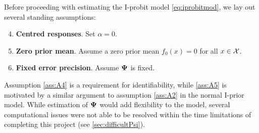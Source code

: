 Before proceeding with estimating the I-probit model \cref{eq:iprobitmod}, we lay out several standing assumptions:
\begin{enumerate}[label=A\arabic*,ref=A\arabic*]
  \setcounter{enumi}{3}
  \item \textbf{Centred responses}. Set $\alpha = 0$. \label{ass:A4}  
  \item \textbf{Zero prior mean}. Assume a zero prior mean $f_0(x) = 0$ for all $x\in{\mathcal X}$. \label{ass:A5} 
  \item \textbf{Fixed error precision}. Assume ${\bm\Psi}$ is fixed. \label{ass:A6} 
\end{enumerate}
Assumption \ref{ass:A4} is a requirement for identifiability, while \ref{ass:A5} is motivated by a similar argument to assumption \ref{ass:A2} in the normal I-prior model.
While estimation of ${\bm\Psi}$ would add flexibility to the model, several computational issues were not able to be resolved within the time limitations of completing this project (see \cref{sec:difficultPsi}).
